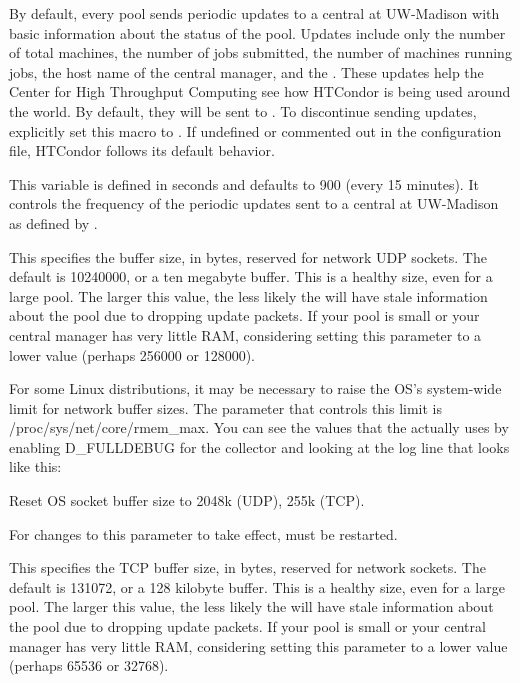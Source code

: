 \begin{description}
\label{param:CondorDevelopersCollector}
\item[\Macro{CONDOR\_DEVELOPERS\_COLLECTOR}]
  By default, every pool sends
  periodic updates to a central  at UW-Madison with
  basic information about the status of the pool.  Updates include only
  the number of total machines, the number of jobs submitted, the
  number of machines running jobs, the host name of the central
  manager, and the .  These
  updates help the Center for High Throughput Computing see how HTCondor 
  is being used around the world.
  By default, they will be sent to .
  To discontinue sending updates,
  explicitly set this macro to . 
  If undefined or commented out in the configuration file, HTCondor follows
  its default behavior.

\label{param:CollectorUpdateInterval}
\item[\Macro{COLLECTOR\_UPDATE\_INTERVAL}]
  This variable is defined in seconds and defaults to 900 (every 15 minutes).
  It controls the frequency of the periodic
  updates sent to a central  at UW-Madison as
  defined by .

\label{param:CollectorSocketBufsize}
\item[\Macro{COLLECTOR\_SOCKET\_BUFSIZE}] 
  This specifies the buffer size, in
  bytes, reserved for  network UDP sockets.  The default is
  10240000, or a ten megabyte buffer.  This is a healthy size, even for a large
  pool.  The larger this value, the less likely the  will
  have stale information about the pool due to dropping update packets.  If
  your pool is small or your central manager has very little RAM, considering
  setting this parameter to a lower value (perhaps 256000 or 128000).

  \Note For some Linux distributions, it may be necessary to raise the
  OS's system-wide limit for network buffer sizes. The parameter that
  controls this limit is /proc/sys/net/core/rmem\_max. You can see the
  values that the  actually uses by enabling D\_FULLDEBUG
  for the collector and looking at the log line that looks like this:

  Reset OS socket buffer size to 2048k (UDP), 255k (TCP).

  For changes to this parameter to take effect,  must
  be restarted.

\label{param:CollectorTcpSocketBufsize}
\item[\Macro{COLLECTOR\_TCP\_SOCKET\_BUFSIZE}]
  This specifies the TCP buffer
  size, in  bytes, reserved for  network sockets.  The
  default is 131072, or a 128 kilobyte buffer.  This is a healthy size, even
  for a large pool.  The larger this value, the less likely the
   will have stale information about the pool due to
  dropping update packets.  If your pool is small or your central
  manager has very little RAM, considering setting this parameter to a
  lower value (perhaps 65536 or 32768).


\end{description}
